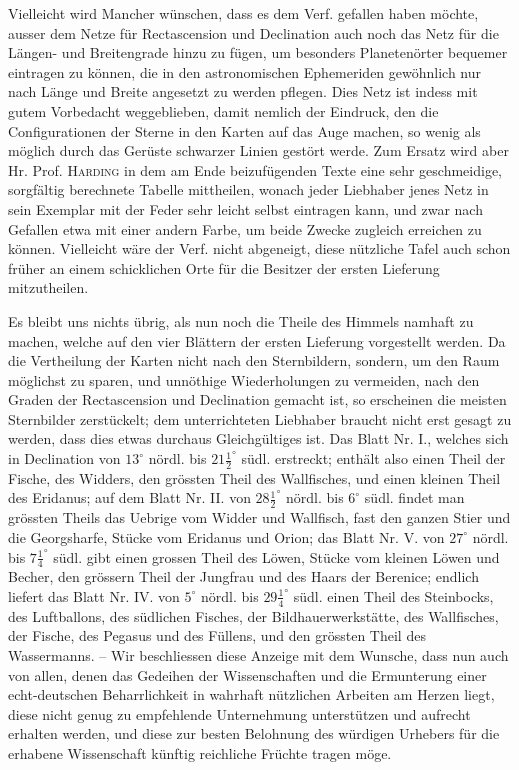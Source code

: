 Vielleicht wird Mancher wünschen, dass es dem Verf. gefallen haben möchte, ausser dem Netze für Rectascension und Declination auch noch das Netz für die Längen- und Breitengrade hinzu zu fügen, um besonders Planetenörter bequemer eintragen zu können, die in den astronomischen Ephemeriden gewöhnlich nur nach Länge und Breite angesetzt zu werden pflegen. Dies Netz ist indess mit gutem Vorbedacht weggeblieben, damit nemlich der Eindruck, den die Configurationen der Sterne in den Karten auf das Auge machen, so wenig als möglich durch das Gerüste schwarzer Linien gestört werde. Zum Ersatz wird aber Hr. Prof. \textsc{Harding} in dem am Ende beizufügenden Texte eine sehr geschmeidige, sorgfältig berechnete Tabelle mittheilen, wonach jeder Liebhaber jenes Netz in sein Exemplar mit der Feder sehr leicht selbst eintragen kann, und zwar nach Gefallen etwa mit einer andern Farbe, um beide Zwecke zugleich erreichen zu können. Vielleicht wäre der Verf. nicht abgeneigt, diese nützliche Tafel auch schon früher an einem schicklichen Orte für die Besitzer der ersten Lieferung mitzutheilen.

Es bleibt uns nichts übrig, als nun noch die Theile des Himmels namhaft zu machen, welche auf den vier Blättern der ersten Lieferung vorgestellt werden. Da die Vertheilung der Karten nicht nach den Sternbildern, sondern, um den Raum möglichst zu sparen, und unnöthige Wiederholungen zu vermeiden, nach den Graden der Rectascension und Declination gemacht ist, so erscheinen die meisten Sternbilder zerstückelt; dem unterrichteten Liebhaber braucht nicht erst gesagt zu werden, dass dies etwas durchaus Gleichgültiges ist. Das Blatt Nr. I., welches sich in Declination von $13^\circ$ nördl. bis $21\frac{1}{2}^\circ$ südl. erstreckt; enthält also einen Theil der Fische, des Widders, den grössten Theil des Wallfisches, und einen kleinen Theil des Eridanus; auf dem Blatt Nr. II. von $28\frac{1}{2}^\circ$ nördl. bis $6^\circ$ südl. findet man grössten Theils das Uebrige vom Widder und Wallfisch, fast den ganzen Stier und die Georgsharfe, Stücke vom Eridanus und Orion; das Blatt Nr. V. von $27^\circ$ nördl. bis $7\frac{1}{4}^\circ$ südl. gibt einen grossen Theil des Löwen, Stücke vom kleinen Löwen und Becher, den grössern Theil der Jungfrau und des Haars der Berenice; endlich liefert das Blatt Nr. IV. von $5^\circ$ nördl. bis $29\frac{1}{4}^\circ$ südl. einen Theil des Steinbocks, des Luftballons, des südlichen Fisches, der Bildhauerwerkstätte, des Wallfisches, der Fische, des Pegasus und des Füllens, und den grössten Theil des Wassermanns. -- Wir beschliessen diese Anzeige mit dem Wunsche, dass nun auch von allen, denen das Gedeihen der Wissenschaften und die Ermunterung einer echt-deutschen Beharrlichkeit in wahrhaft nützlichen Arbeiten am Herzen liegt, diese nicht genug zu empfehlende Unternehmung unterstützen und aufrecht erhalten werden, und diese zur besten Belohnung des würdigen Urhebers für die erhabene Wissenschaft künftig reichliche Früchte tragen möge.
